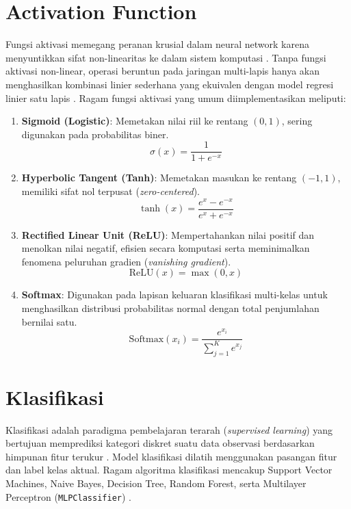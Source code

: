 \documentclass[a4paper,oneside,12pt]{report}
\begin{document}
\section{Activation Function}
Fungsi aktivasi memegang peranan krusial dalam neural network karena menyuntikkan sifat non-linearitas ke dalam sistem komputasi \cite{ref_nielsen}. Tanpa fungsi aktivasi non-linear, operasi beruntun pada jaringan multi-lapis hanya akan menghasilkan kombinasi linier sederhana yang ekuivalen dengan model regresi linier satu lapis \cite{ref_haykin}. Ragam fungsi aktivasi yang umum diimplementasikan meliputi:
\begin{enumerate}
    \item \textbf{Sigmoid (Logistic)}: Memetakan nilai riil ke rentang $(0, 1)$, sering digunakan pada probabilitas biner.
    \begin{equation}
        \sigma(x) = \frac{1}{1 + e^{-x}}
    \end{equation}
    \item \textbf{Hyperbolic Tangent (Tanh)}: Memetakan masukan ke rentang $(-1, 1)$, memiliki sifat nol terpusat (\textit{zero-centered}).
    \begin{equation}
        \tanh(x) = \frac{e^x - e^{-x}}{e^x + e^{-x}}
    \end{equation}
    \item \textbf{Rectified Linear Unit (ReLU)}: Mempertahankan nilai positif dan menolkan nilai negatif, efisien secara komputasi serta meminimalkan fenomena peluruhan gradien (\textit{vanishing gradient}).
    \begin{equation}
        \text{ReLU}(x) = \max(0, x)
    \end{equation}
    \item \textbf{Softmax}: Digunakan pada lapisan keluaran klasifikasi multi-kelas untuk menghasilkan distribusi probabilitas normal dengan total penjumlahan bernilai satu.
    \begin{equation}
        \text{Softmax}(x_i) = \frac{e^{x_i}}{\sum_{j=1}^{K} e^{x_j}}
    \end{equation}
\end{enumerate}

\section{Klasifikasi}
Klasifikasi adalah paradigma pembelajaran terarah (\textit{supervised learning}) yang bertujuan memprediksi kategori diskret suatu data observasi berdasarkan himpunan fitur terukur \cite{ref_roihan}. Model klasifikasi dilatih menggunakan pasangan fitur dan label kelas aktual. Ragam algoritma klasifikasi mencakup Support Vector Machines, Naive Bayes, Decision Tree, Random Forest, serta Multilayer Perceptron (\texttt{MLPClassifier}) \cite{ref_roihan}.
\end{document}
